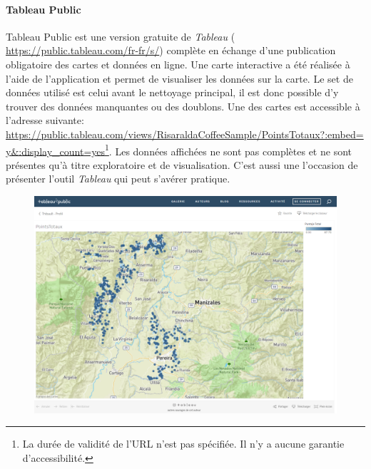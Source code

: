 \paragraph{Tableau Public} Tableau Public est une version gratuite de \textit{Tableau} (\url{
	https://public.tableau.com/fr-fr/s/}) complète en échange d'une publication obligatoire des cartes et données en ligne. Une carte interactive a été réalisée à l'aide de l'application et permet de visualiser les données sur la carte. Le set de données utilisé est celui avant le nettoyage principal, il est donc possible d'y trouver des données manquantes ou des doublons. Une des cartes est accessible à l'adresse suivante: \url{https://public.tableau.com/views/RisaraldaCoffeeSample/PointsTotaux?:embed=y&:display_count=yes}\footnote{La durée de validité de l'URL n'est pas spécifiée. Il n'y a aucune garantie d'accessibilité.}. Les données affichées ne sont pas complètes et ne sont présentes qu'à titre exploratoire et de visualisation. C'est aussi une l'occasion de présenter l'outil \textit{Tableau} qui peut s'avérer pratique.



\begin{figure}[H]
	\centering
	\includegraphics[width=1\linewidth]{img/tableauOnline}
	\caption{}
	\label{fig:tableauonline}
\end{figure}












